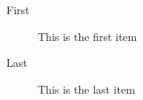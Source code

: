 \documentclass[DIV=calc, paper=a4, fontsize=11pt, twocolumn]{scrartcl}
\begin{document}
\lipsum[8] %

\begin{description}
\item[First] This is the first item
\item[Last] This is the last item
\end{description}

\lipsum[9] %

\fi %








\end{document}
